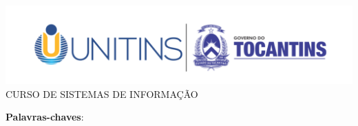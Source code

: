 \begin{folhadeaprovacao}

  	
  	
  	\begin{center}
  		\includegraphics[width=1\textwidth]{imagens/unitins.png}
  		\ABNTEXchapterfont\Large   CURSO DE SISTEMAS DE INFORMA{\c{C}}{\~{A}}O
  		
  		\par
  		\vspace*{1cm}     
  		{\ABNTEXchapterfont\bfseries\large \expandafter\MakeUppercase{\imprimirtitulo}  \vspace*{1cm}    }
  		\par
  		{\large \expandafter\MakeUppercase{\imprimirautor}}
  		\par
  		\vspace*{1cm}     
  		\hspace{.45\textwidth}
  		\begin{minipage}{.5\textwidth}
  			\small\imprimirpreambulo
  			
  		\end{minipage}%
  	\end{center}
  
        
   
   
      
   \begin{center}
    \vspace*{0.5cm}
    {\large\imprimirlocal}
    \par
    {\large\imprimirdata}
    \vspace*{1cm}
  \end{center}
  
\end{folhadeaprovacao}



\setlength{\absparsep}{18pt} %
\begin{resumo}



 \textbf{Palavras-chaves}: 
 
\end{resumo}

